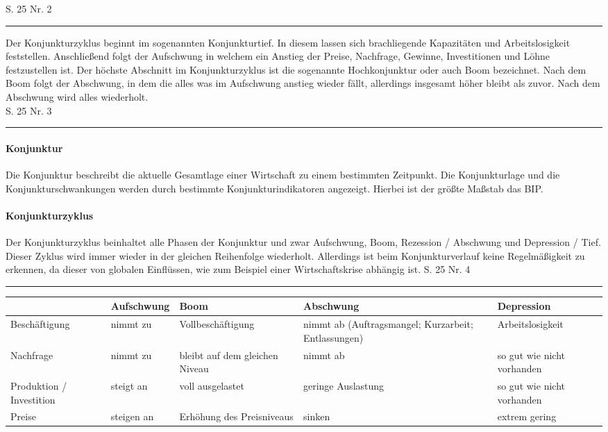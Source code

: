 \documentclass[12pt,a4paper,landscape]{report}
\begin{document}
	\noindent
	\Large
	S. 25 Nr. 2
	\vspace{0.1cm}
	\hrule
	\vspace{.2cm}
	\large
	\noindent
	Der Konjunkturzyklus beginnt im sogenannten Konjunkturtief.
	In diesem lassen sich brachliegende Kapazitäten und Arbeitslosigkeit feststellen.
	Anschließend folgt der Aufschwung in welchem ein Anstieg der Preise, Nachfrage, Gewinne, Investitionen und Löhne festzustellen ist.
	Der höchste Abschnitt im Konjunkturzyklus ist die sogenannte Hochkonjunktur oder auch Boom bezeichnet.
	Nach dem Boom folgt der Abschwung, in dem die alles was im Aufschwung anstieg wieder fällt, allerdings insgesamt höher bleibt als zuvor.
	Nach dem Abschwung wird alles wiederholt.
	\\[1cm]
	\Large S. 25 Nr. 3
	\vspace{0.1cm}
	\hrule
	\vspace{.2cm}
	\large
	\noindent
	\paragraph{Konjunktur} Die Konjunktur beschreibt die aktuelle Gesamtlage einer Wirtschaft zu einem bestimmten Zeitpunkt.
	Die Konjunkturlage und die Konjunkturschwankungen werden durch bestimmte Konjunkturindikatoren angezeigt.
	Hierbei ist der größte Maßstab das BIP.
	\paragraph{Konjunkturzyklus} 	Der Konjunkturzyklus beinhaltet alle Phasen der Konjunktur und zwar Aufschwung, Boom, Rezession / Abschwung und Depression / Tief.
	Dieser Zyklus wird immer wieder in der gleichen Reihenfolge wiederholt.
	Allerdings ist beim Konjunkturverlauf keine Regelmäßigkeit zu erkennen, da dieser von globalen Einflüssen, wie zum Beispiel einer Wirtschaftskrise abhängig ist.
	\newpage
	\noindent
	\Large S. 25 Nr. 4
	\vspace{0.1cm}
	\hrule
	\vspace{1cm}
	\large
	\noindent
	\begin{tabularx}{\linewidth}{|X|X|X|X|X|}
		\hline
		& Aufschwung & Boom & Abschwung & Depression \\
		\hline
		Beschäftigung & nimmt zu & Vollbeschäftigung & nimmt ab (Auftragsmangel; Kurzarbeit; Entlassungen) & Arbeitslosigkeit \\
		\hline
		Nachfrage & nimmt zu & bleibt auf dem gleichen Niveau & nimmt ab & so gut wie nicht vorhanden \\
		\hline
		Produktion / Investition & steigt an & voll ausgelastet & geringe Auslastung & so gut wie nicht vorhanden \\
		\hline
		Preise & steigen an & Erhöhung des Preisniveaus & sinken & extrem gering \\
		\hline
	\end{tabularx}
	
\end{document}
